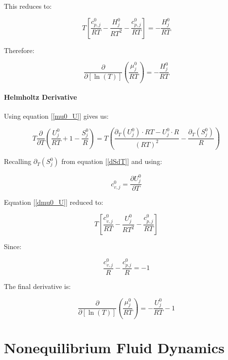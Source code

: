 \documentclass[10pt]{article}
\begin{document}
\begin{flushleft}
This reduces to:

\begin{equation}
    T \left [  \frac{c_{p,j}^0}{RT} - \frac{H_j^0}{RT^2}  - \frac{c_{p,j}^0}{RT} \right] = -\frac{H_j^0}{RT}
\end{equation}

Therefore:

\begin{equation}
    \boxed{\frac{\partial}{\partial[\ln(T)]} \left( \frac{\mu_j^0}{RT} \right) = -\frac{H_j^0}{RT} }
\end{equation}

\subsection{Helmholtz Derivative}
\label{derivativesF}

Using equation [\ref{mu0_U}] gives us:

\begin{equation}
    T \frac{\partial }{\partial T} \left( \frac{U_j^0}{RT}  + 1- \frac{S_j^0}{R} \right) = T \left( \frac{\partial_T(U_j^0) \cdot RT - U_j^0\cdot R}{(RT)^2} - \frac{\partial_T(S_j^0)}{R}\right)
    \label{dmu0_U}
\end{equation}

Recalling $\partial_T (S_j^0)$ from equation [\ref{dSdT}] and using:\

\begin{equation}
    c_{v,j}^0 = \frac{\partial U_j^0}{\partial T}
\end{equation}

Equation [\ref{dmu0_U}] reduced to:

\begin{equation}
    T \left[ \frac{c_{v,j}^0}{RT} - \frac{U_j^0}{RT^2} - \frac{c_{p,j}^0}{RT} \right]
\end{equation}

Since:

\begin{equation}
    \frac{c_{v,j}^0}{R} - \frac{c_{p.j}^0}{R} = -1
\end{equation}

The final derivative is:

\begin{equation}
    \boxed{ \frac{\partial}{\partial [\ln(T)]} \left( \frac{\mu_j^0}{RT} \right) = -\frac{U_j^0}{RT} - 1}
\end{equation}

\part{Nonequilibrium Fluid Dynamics}



\end{flushleft}
\end{document}
